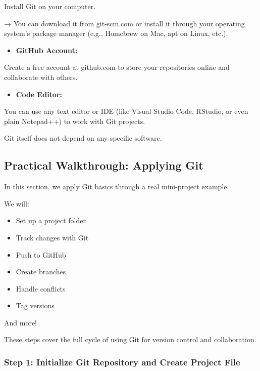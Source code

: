 \documentclass[
  11pt,
  a4paper,
]{article}
\providecommand{\tightlist}{%
  \setlength{\itemsep}{0pt}\setlength{\parskip}{0pt}}\usepackage{longtable,booktabs,array}
\begin{document}
Install Git on your computer.

→ You can download it from git-scm.com or install it through your
operating system's package manager (e.g., Homebrew on Mac, apt on Linux,
etc.).

\begin{itemize}
\tightlist
\item
  \textbf{GitHub Account:}
\end{itemize}

Create a free account at github.com to store your repositories online
and collaborate with others.

\begin{itemize}
\tightlist
\item
  \textbf{Code Editor:}
\end{itemize}

You can use any text editor or IDE (like Visual Studio Code, RStudio, or
even plain Notepad++) to work with Git projects.

Git itself does not depend on any specific software. \newpage

\subsection{Practical Walkthrough: Applying
Git}\label{practical-walkthrough-applying-git}

In this section, we apply Git basics through a real mini-project
example.

We will:

\begin{itemize}
\item
  Set up a project folder
\item
  Track changes with Git
\item
  Push to GitHub
\item
  Create branches
\item
  Handle conflicts
\item
  Tag versions
\end{itemize}

And more!

These steps cover the full cycle of using Git for version control and
collaboration.

\subsubsection{Step 1: Initialize Git Repository and Create Project
File}\label{step-1-initialize-git-repository-and-create-project-file}
\end{document}
